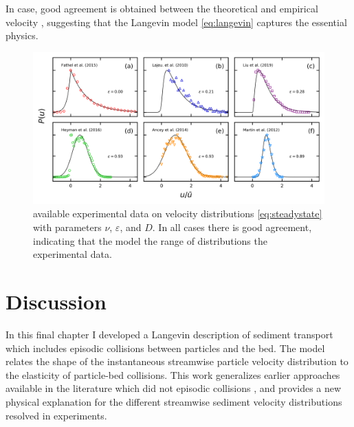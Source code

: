 In \DIFdelbegin {}\DIFdelend \DIFaddbegin {}\DIFaddend case, good agreement is obtained between the theoretical and empirical velocity \DIFdelbegin {}\DIFdelend \DIFaddbegin {}\DIFaddend , suggesting that the Langevin model \DIFaddbegin {}\DIFaddend \ref{eq:langevin} captures the essential physics.
\begin{figure}
	\centerline{\includegraphics{./figures/ch5/Fig4expComparison.png}}
	\caption{\DIFdelbeginFL {}\DIFdelendFL \DIFaddbeginFL {}\DIFaddendFL available experimental data on velocity distributions \DIFdelbeginFL {}\DIFdelendFL \DIFaddbeginFL {}\DIFaddendFL \ref{eq:steadystate} with \DIFaddbeginFL {}\DIFaddendFL parameters $\nu$, $\varepsilon$, and $D$\DIFdelbeginFL {}\DIFdelendFL . In all cases there is good agreement, indicating that the model \DIFdelbeginFL {}\DIFdelendFL \DIFaddbeginFL {}\DIFaddendFL the range of distributions \DIFdelbeginFL {}\DIFdelendFL \DIFaddbeginFL {}\DIFaddendFL the experimental data.} \label{fig:fig4ch5}
\end{figure}


\section{Discussion}
\label{sec:langdiscussion}

In this final chapter I developed a Langevin description of \DIFdelbegin {}\DIFdelend \DIFaddbegin {}\DIFaddend sediment transport which includes episodic collisions between particles and the bed.
The model relates the shape of the instantaneous streamwise particle velocity distribution to the elasticity of particle-bed collisions.
This work generalizes earlier approaches available in the literature which did not \DIFdelbegin {}\DIFdelend \DIFaddbegin {}\DIFaddend episodic collisions \citep{Ancey2014,Fan2014}, and provides a new physical explanation for the different streamwise sediment velocity distributions resolved in experiments.

